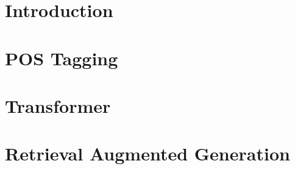 \chapter{Introduction}



\chapter{POS Tagging}

\chapter{Transformer}

\chapter{Retrieval Augmented Generation}

